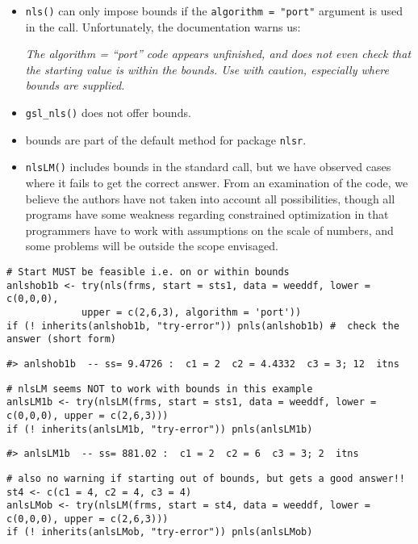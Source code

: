 \begin{itemize}
\item
  \texttt{nls()} can only impose bounds if the \texttt{algorithm\ =\ "port"} argument is
  used in the call. Unfortunately, the documentation warns us:

  \emph{The algorithm = ``port'' code appears unfinished, and does not even
  check that the starting value is within the bounds. Use with
  caution, especially where bounds are supplied.}
\item
  \texttt{gsl\_nls()} does not offer bounds.
\item
  bounds are part of the default method for package \texttt{nlsr}.
\item
  \texttt{nlsLM()} includes bounds in the standard call, but we have observed cases
  where it fails to get the correct answer. From an examination of the code,
  we believe the authors have not taken into account all possibilities, though
  all programs have some weakness regarding constrained optimization in that
  programmers have to work with assumptions on the scale of numbers,
  and some problems will be outside the scope envisaged.
\end{itemize}

\begin{verbatim}
# Start MUST be feasible i.e. on or within bounds
anlshob1b <- try(nls(frms, start = sts1, data = weeddf, lower = c(0,0,0),
             upper = c(2,6,3), algorithm = 'port'))
if (! inherits(anlshob1b, "try-error")) pnls(anlshob1b) #  check the answer (short form)
\end{verbatim}

\begin{verbatim}
#> anlshob1b  -- ss= 9.4726 :  c1 = 2  c2 = 4.4332  c3 = 3; 12  itns
\end{verbatim}

\begin{verbatim}
# nlsLM seems NOT to work with bounds in this example
anlsLM1b <- try(nlsLM(frms, start = sts1, data = weeddf, lower = c(0,0,0), upper = c(2,6,3)))
if (! inherits(anlsLM1b, "try-error")) pnls(anlsLM1b)
\end{verbatim}

\begin{verbatim}
#> anlsLM1b  -- ss= 881.02 :  c1 = 2  c2 = 6  c3 = 3; 2  itns
\end{verbatim}

\begin{verbatim}
# also no warning if starting out of bounds, but gets a good answer!!
st4 <- c(c1 = 4, c2 = 4, c3 = 4)
anlsLMob <- try(nlsLM(frms, start = st4, data = weeddf, lower = c(0,0,0), upper = c(2,6,3)))
if (! inherits(anlsLMob, "try-error")) pnls(anlsLMob)
\end{verbatim}


